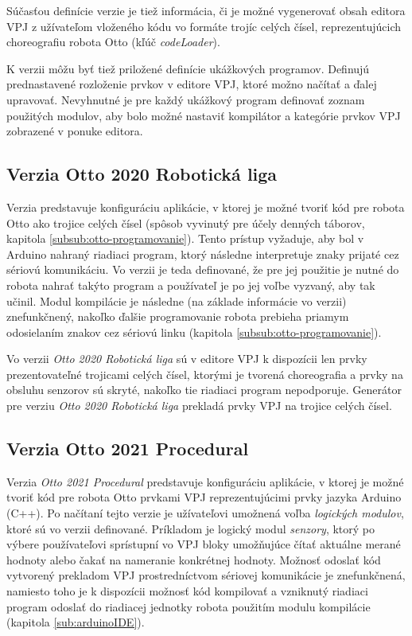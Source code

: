 Súčasťou definície verzie je tiež informácia, či je možné vygenerovať obsah editora VPJ z užívateľom vloženého kódu vo formáte trojíc celých čísel, reprezentujúcich choreografiu robota Otto (kľúč \textit{codeLoader}).

K verzii môžu byť tiež priložené definície ukážkových programov. Definujú prednastavené rozloženie prvkov v editore VPJ, ktoré možno načítať a ďalej upravovať. Nevyhnutné je pre každý ukážkový program definovať zoznam použitých modulov, aby bolo možné nastaviť kompilátor a kategórie prvkov VPJ zobrazené v ponuke editora.

\subsection{Verzia Otto 2020 Robotická liga}
\label{sub:verzia-otto-2020-rl}
Verzia predstavuje konfiguráciu aplikácie, v ktorej je možné tvoriť kód pre robota Otto ako trojice celých čísel (spôsob vyvinutý pre účely denných táborov, kapitola \ref{subsub:otto-programovanie}). Tento prístup vyžaduje, aby bol v Arduino nahraný  riadiaci program, ktorý následne interpretuje znaky prijaté cez sériovú komunikáciu. Vo verzii je teda definované, že pre jej použitie je nutné do robota nahrať takýto program a používateľ je po jej voľbe vyzvaný, aby tak učinil. Modul kompilácie je následne (na základe informácie vo verzii) znefunkčnený, nakoľko ďalšie programovanie robota prebieha priamym odosielaním znakov cez sériovú linku (kapitola \ref{subsub:otto-programovanie}).

Vo verzii \textit{Otto 2020 Robotická liga} sú v editore VPJ k dispozícii len prvky prezentovateľné trojicami celých čísel, ktorými je tvorená choreografia a prvky na obsluhu senzorov sú skryté, nakoľko tie riadiaci program nepodporuje. Generátor pre verziu \textit{Otto 2020 Robotická liga} prekladá prvky VPJ na trojice celých čísel.

\subsection{Verzia Otto 2021 Procedural}
\label{sub:verzia-otto-2021-procedural}
Verzia \textit{Otto 2021 Procedural} predstavuje konfiguráciu aplikácie, v ktorej je možné tvoriť kód pre robota Otto prvkami VPJ reprezentujúcimi prvky jazyka Arduino (C++). Po načítaní tejto verzie je užívateľovi umožnená voľba \textit{logických modulov}, ktoré sú vo verzii definované. Príkladom je logický modul \textit{senzory}, ktorý po výbere používateľovi sprístupní vo VPJ bloky umožňujúce čítať aktuálne merané hodnoty alebo čakať na nameranie konkrétnej hodnoty. Možnosť odoslať kód vytvorený prekladom VPJ prostredníctvom sériovej komunikácie je znefunkčnená, namiesto toho je k dispozícii možnosť kód kompilovať a vzniknutý riadiaci program odoslať do riadiacej jednotky robota použitím modulu kompilácie (kapitola \ref{sub:arduinoIDE}).

